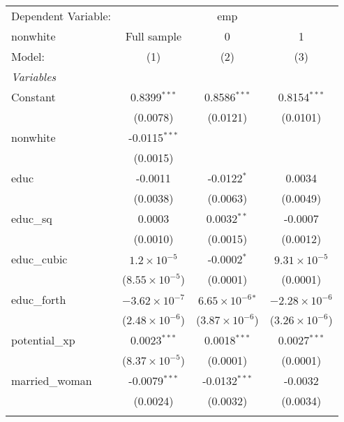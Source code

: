 \begingroup
\centering
\begin{tabular}{lccc}
   \tabularnewline \midrule \midrule
   Dependent Variable: & \multicolumn{3}{c}{emp}\\
   nonwhite        & Full sample             & 0                           & 1 \\   
   Model:          & (1)                     & (2)                         & (3)\\  
   \midrule
   \emph{Variables}\\
   Constant        & 0.8399$^{***}$          & 0.8586$^{***}$              & 0.8154$^{***}$\\   
                   & (0.0078)                & (0.0121)                    & (0.0101)\\   
   nonwhite        & -0.0115$^{***}$         &                             &   \\   
                   & (0.0015)                &                             &   \\   
   educ            & -0.0011                 & -0.0122$^{*}$               & 0.0034\\   
                   & (0.0038)                & (0.0063)                    & (0.0049)\\   
   educ\_sq        & 0.0003                  & 0.0032$^{**}$               & -0.0007\\   
                   & (0.0010)                & (0.0015)                    & (0.0012)\\   
   educ\_cubic     & $1.2\times 10^{-5}$     & -0.0002$^{*}$               & $9.31\times 10^{-5}$\\    
                   & ($8.55\times 10^{-5}$)  & (0.0001)                    & (0.0001)\\   
   educ\_forth     & $-3.62\times 10^{-7}$   & $6.65\times 10^{-6}$$^{*}$  & $-2.28\times 10^{-6}$\\    
                   & ($2.48\times 10^{-6}$)  & ($3.87\times 10^{-6}$)      & ($3.26\times 10^{-6}$)\\    
   potential\_xp   & 0.0023$^{***}$          & 0.0018$^{***}$              & 0.0027$^{***}$\\   
                   & ($8.37\times 10^{-5}$)  & (0.0001)                    & (0.0001)\\   
   married\_woman  & -0.0079$^{***}$         & -0.0132$^{***}$             & -0.0032\\   
                   & (0.0024)                & (0.0032)                    & (0.0034)\\   
$$
\end{tabular}
